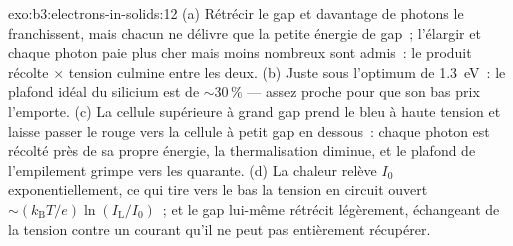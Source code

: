 \begin{solution}{exo:b3:electrons-in-solids:12}
(a) Rétrécir le gap et davantage de photons le franchissent, mais
chacun ne délivre que la petite énergie de gap~; l'élargir et
chaque photon paie plus cher mais moins nombreux sont admis~: le
produit récolte $\times$ tension culmine entre les deux.
(b) Juste sous l'optimum de \qty{1.3}{eV}~: le plafond idéal du
silicium est de $\sim30\,\%$ --- assez proche pour que son bas prix
l'emporte. (c) La cellule supérieure à grand gap prend le bleu à
haute tension et laisse passer le rouge vers la cellule à petit gap
en dessous~: chaque photon est récolté près de sa propre énergie, la
thermalisation diminue, et le plafond de l'empilement grimpe vers
les quarante. (d) La chaleur relève $I_0$ exponentiellement, ce qui
tire vers le bas la tension en circuit ouvert
$\sim(k_{\text{B}}T/e)\ln(I_{\text{L}}/I_0)$~; et le gap lui-même
rétrécit légèrement, échangeant de la tension contre un courant
qu'il ne peut pas entièrement récupérer.
\end{solution}

